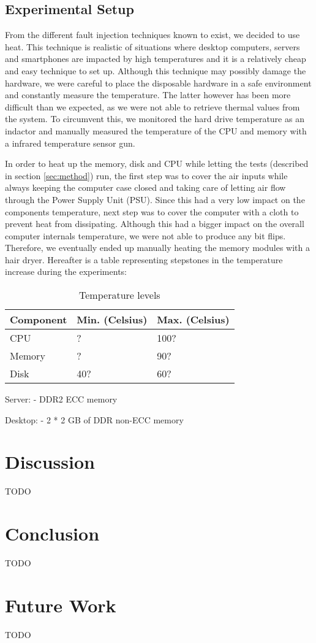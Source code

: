 \documentclass[conference]{IEEEtran}
\begin{document}
\subsection{Experimental Setup}\label{sec:setup}

From the different fault injection techniques known to
exist\cite{barenghi2012fault}, we decided to use heat. This technique is
realistic of situations where desktop computers, servers and smartphones are
impacted by high temperatures and it is a relatively cheap and easy technique
to set up. Although this technique may possibly damage the hardware, we were
careful to place the disposable hardware in a safe environment and constantly
measure the temperature. The latter however has been more difficult than we
expected, as we were not able to retrieve thermal values from the system. To
circumvent this, we monitored the hard drive temperature as an indactor and
manually measured the temperature of the CPU and memory with a infrared
temperature sensor gun.

In order to heat up the memory, disk and CPU while letting the tests (described
in section \ref{sec:method}) run, the first step was to cover the air inputs
while always keeping the computer case closed and taking care of letting air
flow through the Power Supply Unit (PSU). Since this had a very low impact on
the components temperature, next step was to cover the computer with a cloth to
prevent heat from dissipating. Although this had a bigger impact on the overall
computer internals temperature, we were not able to produce any bit flips.
Therefore, we eventually ended up manually heating the memory modules with a
hair dryer. Hereafter is a table representing stepstones in the temperature
increase during the experiments:

\begin{table}[H]
  \centering
  \caption{Temperature levels}
  \label{table-temp}
  \begin{tabular}{|l|l|l|}
    \hline
    \textbf{Component}   & \textbf{Min. (Celsius)} & \textbf{Max. (Celsius)}\\ \hline
    CPU   & ? & 100? \\ \hline
    Memory & ? & 90? \\ \hline
    Disk & 40? & 60? \\ \hline
   \end{tabular}
\end{table}


Server:
- DDR2 ECC memory

Desktop:
- 2 * 2 GB of DDR non-ECC memory



\section{Discussion}\label{sec:disc}

TODO


\section{Conclusion}\label{sec:conc}

TODO


\section{Future Work}\label{sec:futwork}

TODO


\printbibliography
\end{document}
